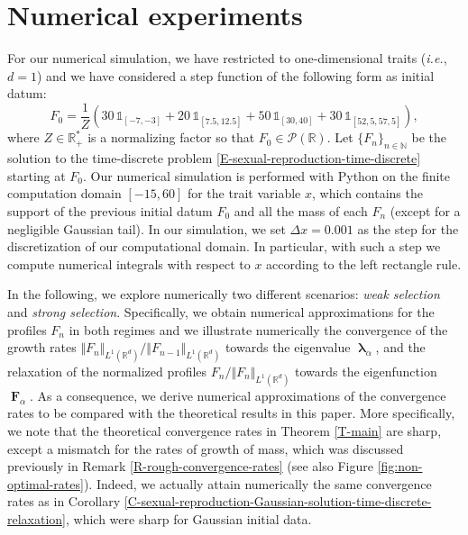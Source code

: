 \documentclass[reqno]{amsart}
\DeclareMathOperator{\blambda}{\boldsymbol{\lambda}}
\DeclareMathOperator{\bF}{\boldsymbol{F}}
\numberwithin{equation}{section}
\begin{document}
{\section{Numerical experiments}\label{S-numerical-experiments}

For our numerical simulation, we have restricted to one-dimensional traits ({\em i.e.}, $d=1$) and we have considered a step function of the following form as initial datum:
\begin{equation}\label{E-simulation-initial-datum}
F_0=\frac{1}{Z}(30\,\mathds{1}_{[-7,-3]}+20\,\mathds{1}_{[7.5,12.5]}+50\,\mathds{1}_{[30,40]}+30\,\mathds{1}_{[52,5,57,5]}),
\end{equation}
where $Z\in\mathbb{R}_+^*$ is a normalizing factor so that $F_0\in \mathcal{P}(\mathbb{R})$. Let $\{F_n\}_{n\in \mathbb{N}}$ be the solution to the time-discrete problem \eqref{E-sexual-reproduction-time-discrete} starting at $F_0$. Our numerical simulation is performed with {\sc Python} on the finite computation domain $[-15,60]$ for the trait variable $x$, which contains the support of the previous initial datum $F_0$ and all the mass of each $F_n$ (except for a negligible Gaussian tail). In our simulation, we set $\Delta x=0.001$ as the step for the discretization of our computational domain. In particular, with such a step we compute numerical integrals with respect to $x$ according to the left rectangle rule.

In the following, we explore numerically two different scenarios: {\em weak selection} and {\em strong selection}. Specifically, we obtain numerical approximations for the profiles $F_n$ in both regimes and we illustrate numerically the convergence of the growth rates $\Vert F_n\Vert_{L^1(\mathbb{R}^d)}/\Vert F_{n-1}\Vert_{L^1(\mathbb{R}^d)}$ towards the eigenvalue $\blambda_\alpha$, and the relaxation of the normalized profiles $F_n/\Vert F_n\Vert_{L^1(\mathbb{R}^d)}$ towards the eigenfunction $\bF_\alpha$. As a consequence, we derive numerical approximations of the convergence rates to be compared with the theoretical results in this paper. More specifically, we note that the theoretical convergence rates in Theorem \ref{T-main} are sharp, except a mismatch for the rates of growth of mass, which was discussed previously in Remark \ref{R-rough-convergence-rates} (see also Figure \ref{fig:non-optimal-rates}). Indeed, we actually attain numerically the same convergence rates as in Corollary \ref{C-sexual-reproduction-Gaussian-solution-time-discrete-relaxation}, which were sharp for Gaussian initial data.



}
\end{document}
